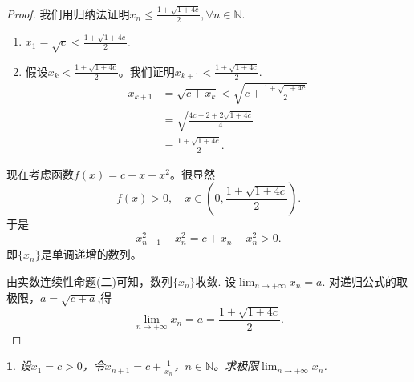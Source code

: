 \documentclass[utf8]{book}
\newtheorem{example}{}[section]             %
\begin{document}
\begin{proof}
我们用归纳法证明$x_n \leq \displaystyle\frac{1+\sqrt{1+4c}}{2}, \forall n\in\mathbb{N}$.
\renewcommand\labelenumi{\normalfont(\theenumi)}
\begin{enumerate}
\item $x_1 = \sqrt{c} < \displaystyle\frac{1+\sqrt{1+4c}}{2}$.
\item 假设$x_k < \displaystyle\frac{1+\sqrt{1+4c}}{2}$。我们证明$x_{k+1} < \displaystyle\frac{1+\sqrt{1+4c}}{2}$.
\begin{equation*}
\begin{split}
x_{k+1} &= \sqrt{c+x_{k}} < \sqrt{c+\frac{1+\sqrt{1+4c}}{2}}\\&=\sqrt{\frac{4c+2+2\sqrt{1+4c}}{4}}\\
&=\frac{1+\sqrt{1+4c}}{2}.
\end{split}
\end{equation*}
\end{enumerate}

现在考虑函数$f(x) =c+x-x^2$。很显然$$f(x) > 0, \quad x\in \left(0, \displaystyle\frac{1+\sqrt{1+4c}}{2}\right).$$
于是$$x_{n+1}^2 -x_{n}^2 = c+ x_{n}-x_n^{2} > 0.$$即$\{x_n\}$是单调递增的数列。

由实数连续性命题(二)可知，数列$\{x_n\}$收敛. 设$\displaystyle \lim_{n\to +\infty}x_n=a$. 对递归公式的取极限，$a=\sqrt{c+a}$,得
$$\displaystyle \lim_{n\to +\infty}x_n=a =\frac{1+\sqrt{1+4c}}{2}.$$
\end{proof}
\begin{example}
设$x_1=c>0$，令$\displaystyle x_{n+1} = c + \frac{1}{x_n}$，$n\in\mathbb{N}$。求极限$\displaystyle \lim_{n\to +\infty}x_n$.
\end{example}
\end{document}
